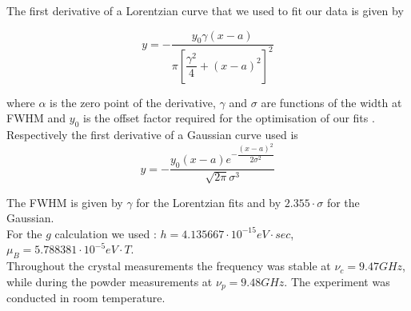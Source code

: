 \documentclass[openany,11pt,a4paper]{report}
\begin{document}
The first derivative of a Lorentzian curve that we used to fit our data is given by

\begin{equation}
y=-\dfrac{ y_{0} \gamma (x-a)}{\pi [ \dfrac{\gamma ^2}{4}  + (x-a)^2]^2}
\label{eq:Lorentzian}
\end{equation}

where $\alpha$ is the zero point of the derivative, $\gamma $ and $\sigma$ are functions of the width at FWHM and $y_{0}$ is the offset factor required for the optimisation of our fits .\\

Respectively the first derivative of a Gaussian curve used is 
\begin{equation}
y=-\dfrac{y_{0}(x-a)e^{-\dfrac{(x-a)^2}{2\sigma ^2}}}{\sqrt{2 \pi } \sigma ^3}
\label{eq:Gaussian}
\end{equation}

The FWHM is given by $\gamma $ for the Lorentzian  fits and by $2.355 \cdot \sigma$ for the Gaussian.\\



For the $g$ calculation we used : $h= 4.135667 \cdot 10^{-15} eV \cdot sec$, $\mu_{B} = 5.788381 \cdot 10^{-5} eV\cdot T$.\\

Throughout the crystal measurements the frequency was stable at $\nu_{c}= 9.47 GHz$, while during the powder measurements at $\nu_{p}= 9.48 GHz$. The experiment was conducted in room temperature.
\end{document}
